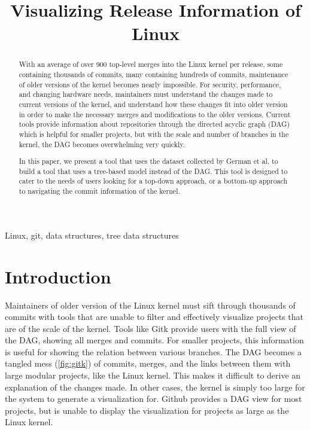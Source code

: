\documentclass[conference, draftclsnofoot]{IEEEtran}
\makeatletter
\newcommand{\TheTitle}{Visualizing Release Information of Linux}
\newcommand{\TheAuthors}{Evan Wilde}
\newcommand{\TheEmails}{etcwilde@uvic.ca}
\newcommand{\TheKeywords}{Linux, git, data structures, tree data structures}
\makeatother
\begin{document}
\title{\TheTitle}
\author{
\IEEEauthorblockA{\TheAuthors}
\IEEEauthorblockA{Email: \TheEmails}
}
\maketitle
\begin{abstract}
	With an average of over 900 top-level merges into the Linux kernel per
	release, some containing thousands of commits, many containing hundreds
	of commits, maintenance of older versions of the kernel becomes nearly
	impossible. For security, performance, and changing hardware needs,
	maintainers must understand the changes made to current versions of the
	kernel, and understand how these changes fit into older version in
        order to make the necessary merges and modifications to the older
        versions. Current tools provide information about repositories through
        the directed acyclic graph (DAG) which is helpful for smaller projects,
        but with the scale and number of branches in the kernel, the DAG
        becomes overwhelming very quickly.

	In this paper, we present a tool that uses the dataset collected by
	German et al. to build a tool that uses a tree-based model instead of
        the DAG. This tool is designed to cater to the needs of users looking
        for a top-down approach, or a bottom-up approach to navigating the
        commit information of the kernel.
\end{abstract}

\begin{IEEEkeywords}
\TheKeywords
\end{IEEEkeywords}

\section{Introduction}

Maintainers of older version of the Linux kernel must sift through thousands of
commits with tools that are unable to filter and effectively visualize projects
that are of the scale of the kernel. Tools like Gitk provide users with the
full view of the DAG, showing all merges and commits. For smaller projects,
this information is useful for showing the relation between various branches.
The DAG becomes a tangled mess (\ref{fig:gitk}) of commits, merges, and the
links between them with large modular projects, like the Linux kernel. This
makes it difficult to derive an explanation of the changes made. In other
cases, the kernel is simply too large for the system to generate a
visualization for. Github provides a DAG view for most projects, but is unable
to display the visualization for projects as large as the Linux kernel.
\end{document}
